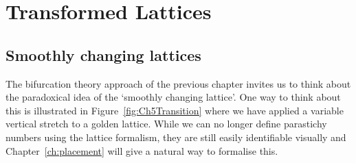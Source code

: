 

\chapter{Transformed Lattices}
\label{ch:transformations}




\section{Smoothly changing lattices}
The bifurcation theory approach of the previous chapter invites us to think about the paradoxical idea of the `smoothly changing lattice'.
One way to think about this is illustrated in Figure~\ref{fig:Ch5Transition} where we have applied a  variable vertical stretch to a golden lattice.
While we can no longer define parastichy numbers using the lattice formalism, they are still easily identifiable visually and Chapter~\ref{ch:placement} will give a natural way to formalise this. 
%

